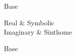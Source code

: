 \begin{codestore}[st = reuse-design]
  Base\begin{borromean}{}
    Real      & Symbolic \\
    Imaginary & Sinthome
  \end{borromean}Base
\end{codestore}

\begin{center}
\end{center}